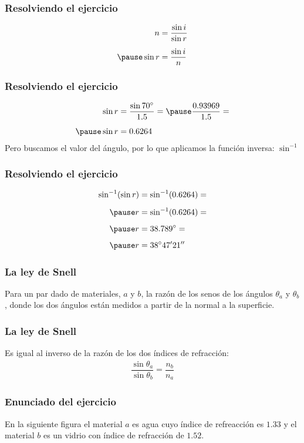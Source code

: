 \documentclass[14pt]{beamer}
\begin{document}
\begin{frame}
\frametitle{Resolviendo el ejercicio}
\pause
\begin{eqnarray*}
\begin{aligned}
n &= \dfrac{\sin i}{\sin r} \\[0.5em] \pause
\sin r &= \dfrac{\sin i}{n}
\end{aligned}
\end{eqnarray*}
\end{frame}
\begin{frame}
\frametitle{Resolviendo el ejercicio}
\pause
\begin{eqnarray*}
\begin{aligned}
\sin r &= \dfrac{\sin \ang{70}}{1.5} = \pause \dfrac{0.93969}{1.5} = \\[0.5em] \pause
\sin r &= 0.6264
\end{aligned}
\end{eqnarray*}
Pero buscamos el valor del ángulo, por lo que aplicamos la función inversa: $\sin^{-1}$
\end{frame}
\begin{frame}
\frametitle{Resolviendo el ejercicio}
\begin{eqnarray*}
\begin{aligned}
\sin^{-1} (\sin r) &= \sin^{-1}(0.6264) = \\[0.5em] \pause
r &= \sin^{-1}(0.6264) = \\[0.5em] \pause
r &= \ang{38.789} = \\[0.5em] \pause
r &= \ang{38;47;21}
\end{aligned}
\end{eqnarray*}
\end{frame}
\begin{frame}
\frametitle{La ley de Snell}
Para un par dado de materiales, $a$ y $b$, la razón de los senos de los ángulos $\theta_{a}$ y $\theta_{b}$, donde los dos ángulos están medidos a partir de la normal a la superficie.
\end{frame}
\begin{frame}
\frametitle{La ley de Snell}
Es igual al inverso de la razón de los dos índices de refracción:
\pause
\begin{align*}
\dfrac{\sin \theta_{a}}{\sin \theta_{b}} = \dfrac{n_{b}}{n_{a}}
\end{align*}
\end{frame}
\begin{frame}
\frametitle{Enunciado del ejercicio}
En la siguiente figura el material $a$ es agua cuyo índice de refreacción es $1.33$ y el material $b$ es un vidrio con índice de refracción de $1.52.$
\end{frame}
\end{document}
